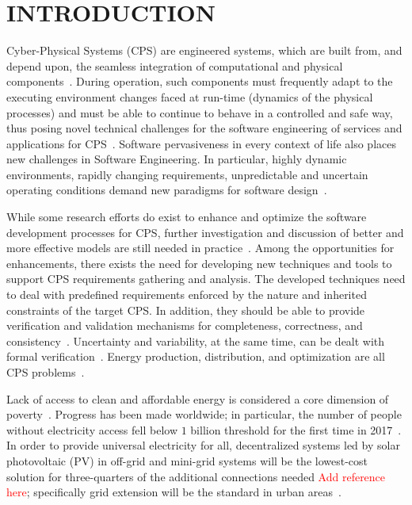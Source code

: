 \documentclass[10pt,conference]{IEEEtran}
\begin{document}
\section{INTRODUCTION}

Cyber-Physical Systems  (CPS) are engineered systems, which are built from, and depend upon, 
the seamless integration of computational  and  physical  components~\cite{NSF2015}. 
During operation, such components must frequently adapt to the executing environment changes 
faced at run-time (dynamics of the physical processes) and must be able to continue to behave 
in a controlled and safe way, thus posing novel technical challenges for the software engineering of services and applications for CPS~\cite{Metzger2014}. %
Software pervasiveness in every context of life also places new challenges in Software Engineering. 
In particular, highly dynamic environments, rapidly changing requirements, unpredictable and uncertain operating conditions demand new paradigms for software design~\cite{Filieri2015}.


While some research efforts do exist to enhance and optimize the software development processes for CPS, further investigation and discussion of better and more effective models are still needed in practice~\cite{Al-Jaroodi2016}. Among the opportunities for enhancements, there exists the need for developing new techniques and tools to support CPS requirements gathering and analysis. The developed techniques need to deal with predefined requirements enforced by the nature and inherited constraints of the target CPS. In addition, they should be able to provide verification and validation mechanisms for completeness, correctness, and consistency~\cite{Al-Jaroodi2016}. Uncertainty and variability, at the same time, can be dealt with formal verification~\cite{NESSI}. Energy production, distribution, and optimization are all CPS problems~\cite{UC}. 

Lack of access to clean and affordable energy is considered a core dimension of poverty~\cite{Hussein2012}. 
Progress has been made worldwide; in particular, the number of people without electricity access 
fell below $1$ billion threshold for the first time in 2017~\cite{IEAweo2018}. 
In order to provide universal electricity for all, decentralized systems led by solar photovoltaic (PV) 
in off-grid and mini-grid systems will be the lowest-cost solution for three-quarters of the additional connections needed \textcolor{red}{Add reference here}; 
specifically grid extension will be the standard in urban areas~\cite{IEAweo2018}.
\end{document}
